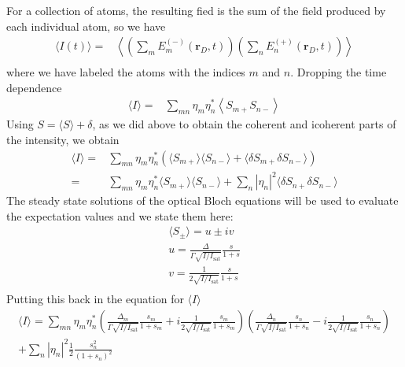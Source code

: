 \documentclass[11pt,letter]{article}
\newcommand{\bv}[1]{\ensuremath{\bm{#1}}}
\begin{document}
For a collection of atoms, the resulting fied is the sum of the field produced by each individual atom, so we have  
\begin{equation}
\begin{split}
\langle I (t) \rangle = & 
    \left\langle \left( \sum_{m} E_{m}^{(-)}(\bv{r}_{D}, t) \right)
            \left( \sum_{n} E_{n}^{(+)}(\bv{r}_{D}, t) \right) \right\rangle \\
\end{split} 
\end{equation}
where we have labeled the atoms with the indices $m$ and $n$.  Dropping the time dependence
\begin{equation}
\begin{split}
\langle I \rangle = &
    \sum_{mn}  \eta_{m}\eta_{n}^{*}  
              \left\langle S_{m+}S_{n-} \right\rangle
\end{split} 
\end{equation}
Using $S=\langle S \rangle + \delta $, as we did above to obtain the coherent and icoherent parts of the intensity, we obtain
\begin{equation}
\begin{split}
\langle I \rangle = &
    \sum_{mn}  \eta_{m}\eta_{n}^{*} \left(
              \langle S_{m+}\rangle \langle S_{n-} \rangle  
            + \langle \delta S_{m+} \delta S_{n-} \rangle \right) \\
    = & 
    \sum_{mn}  \eta_{m}\eta_{n}^{*} 
        \langle  S_{m+}\rangle \langle S_{n-} \rangle 
   + \sum_{n} | \eta_{n}|^{2} \langle \delta S_{n+} \delta S_{n-} \rangle  
\end{split} 
\end{equation}
The steady state solutions of the optical Bloch equations will be used to evaluate the expectation values and we state them here:
\begin{gather} 
    \langle S_{\pm} \rangle =  u \pm i v  \\
    u =  \frac{ \Delta }{ \Gamma  \sqrt{ I / I_{\mathrm{sat}}} } \frac{s}{ 1 + s } \\
    v =  \frac{ 1 } { 2 \sqrt{ I / I_{\mathrm{sat}}} } \frac{s}{1+s} \\
\end{gather}
Putting this back in the equation for $\langle I \rangle$  
\begin{multline}
\langle I \rangle = 
  \sum_{mn}  \eta_{m}\eta_{n}^{*}
    \left(
    \frac{ \Delta_{m} }{ \Gamma  \sqrt{ I / I_{\mathrm{sat}}} } 
    \frac{s_{m}}{ 1 + s_{m} } 
   + i 
    \frac{ 1 } { 2 \sqrt{ I / I_{\mathrm{sat}}} } \frac{s_{m}}{1+s_{m}} 
    \right) 
    \left(
    \frac{ \Delta_{n} }{ \Gamma  \sqrt{ I / I_{\mathrm{sat}}} } 
    \frac{s_{n}}{ 1 + s_{n} } 
   - i 
    \frac{ 1 } { 2 \sqrt{ I / I_{\mathrm{sat}}} } \frac{s_{n}}{1+s_{n}} 
    \right) \\
   + \sum_{n} | \eta_{n}|^{2} \frac{1}{2} \frac{ s_{n}^{2} } { (1 + s _{n} )^{2} } 
\end{multline}
\end{document}
